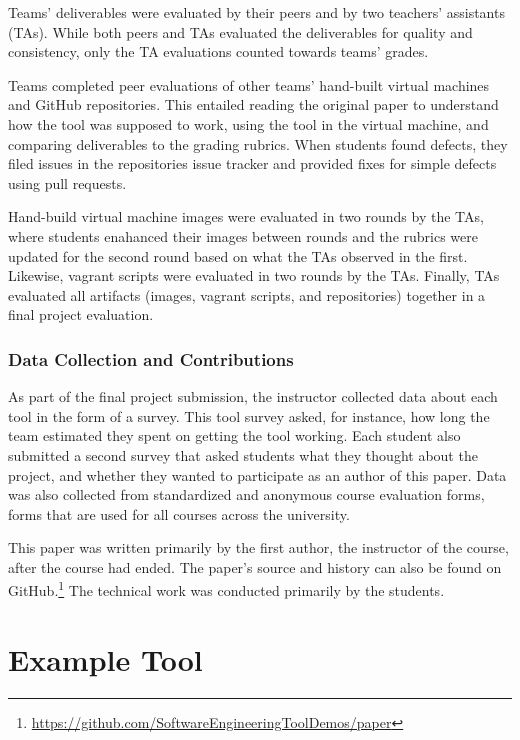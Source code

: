 \documentclass{sig-alternate-05-2015}
\begin{document}
Teams' deliverables were evaluated by their 
peers and by two teachers' assistants (TAs).
While both peers and TAs evaluated the deliverables
for quality and consistency, only the TA evaluations
counted towards teams' grades.

Teams completed peer evaluations of other teams' hand-built 
virtual machines and GitHub repositories.
This entailed reading the original paper to understand
how the tool was supposed to work, 
using the tool in the virtual machine,
and comparing deliverables to the grading rubrics.
When students found defects, they filed issues 
in the repositories issue tracker and provided
fixes for simple defects using pull requests.


Hand-build virtual machine images were evaluated in 
two rounds by the TAs, where students enahanced their
images between rounds and the rubrics were updated
for the second round based on what the TAs 
observed in the first.
Likewise, vagrant scripts were evaluated in two rounds
by the TAs.
Finally, TAs evaluated all artifacts (images, vagrant 
scripts, and repositories) together in a final project 
evaluation.

\subsubsection{Data Collection and Contributions}

As part of the final project submission, 
the instructor collected data about 
each tool in the form of a survey.
This tool survey asked, for instance, how long
the team estimated they spent on getting 
the tool working.
Each student also submitted a second survey that
asked students what they thought about the project,
and whether they wanted to participate as an
author of this paper.
Data was also collected from standardized and 
anonymous course evaluation forms, forms
that are used for all courses 
across the university.

This paper was written primarily by the first author,
the instructor of the course, after the course 
had ended.
The paper's source and history can also be found 
on GitHub.\footnote{\url{https://github.com/SoftwareEngineeringToolDemos/paper}}
The technical work was conducted primarily by the students.

\section{Example Tool}
\end{document}
